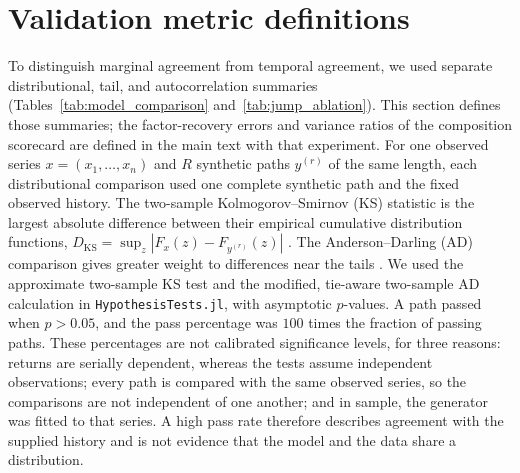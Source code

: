 \section{Validation metric definitions}
\label{sec:supp-validation}

To distinguish marginal agreement from temporal agreement, we used
separate distributional, tail, and autocorrelation summaries
(Tables~\ref{tab:model_comparison} and~\ref{tab:jump_ablation}).
This section defines those summaries; the factor-recovery errors and
variance ratios of the composition scorecard are defined in the main
text with that experiment. For one observed series $x=(x_1,\ldots,x_n)$ and $R$ synthetic
paths $y^{(r)}$ of the same length, each distributional comparison
used one complete synthetic path and the fixed observed history.
The two-sample Kolmogorov--Smirnov (KS) statistic is the largest
absolute difference between their empirical cumulative distribution
functions, $D_{\mathrm{KS}}=\sup_z|F_x(z)-F_{y^{(r)}}(z)|$
\cite{kolmogorov1933,smirnov1948}. The Anderson--Darling (AD)
comparison gives greater weight to differences near the tails
\cite{andersonDarling1952}. We used the approximate two-sample KS
test and the modified, tie-aware two-sample AD calculation in
\texttt{HypothesisTests.jl}, with asymptotic $p$-values. A path
passed when $p>0.05$, and the pass percentage was $100$ times the
fraction of passing paths. These percentages are not calibrated
significance levels, for three reasons: returns are serially
dependent, whereas the tests assume independent observations; every
path is compared with the same observed series, so the comparisons
are not independent of one another; and in sample, the generator was
fitted to that series. A high pass rate therefore describes agreement
with the supplied history and is not evidence that the model and the
data share a distribution.

